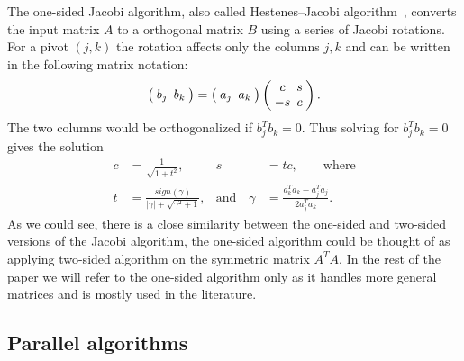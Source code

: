 \documentclass[10pt, conference, compsocconf]{IEEEtran}
\begin{document}
The one-sided Jacobi algorithm, also called Hestenes–Jacobi algorithm~\cite{hestenes1958inversion}, converts the input matrix $A$ to a orthogonal matrix $B$ using a series of Jacobi rotations. For a pivot $(j,k)$ the rotation affects only the columns $j,k$ and can be written in the following matrix notation:
\begin{align}
\setlength{\arraycolsep}{2.5pt}
  \left(\begin{array}{cc}
    b_{j} & b_{k} 
  \end{array} \right)
  =
  \left(\begin{array}{cc}
    a_{j} & a_{k} 
  \end{array} \right)
  \left(\begin{array}{cc}
    c & s \\
    -s & c
  \end{array} \right).
\end{align}
The two columns would be orthogonalized if $b_j^T b_k = 0$. Thus solving for $b_{j}^T b_{k} = 0$ gives the solution 
\begin{align}
  c &= \frac{1}{\sqrt{1+t^2}}, & s&=tc, \qquad \text{where} \nonumber \\
  t &= \frac{sign(\gamma)}{|\gamma|+\sqrt{\gamma^2+1}}, & \text{and} \quad \gamma &= \frac{a_k^T a_k - a_j^T a_j}{2a_j^Ta_k}.
\end{align}
As we could see, there is a close similarity between the one-sided and two-sided versions of the Jacobi algorithm, the one-sided algorithm could be thought of as applying two-sided algorithm on the symmetric matrix $A^TA$. In the rest of the paper we will refer to the one-sided algorithm only as it handles more general matrices and is mostly used in the literature.

\subsection{Parallel algorithms}
\end{document}
